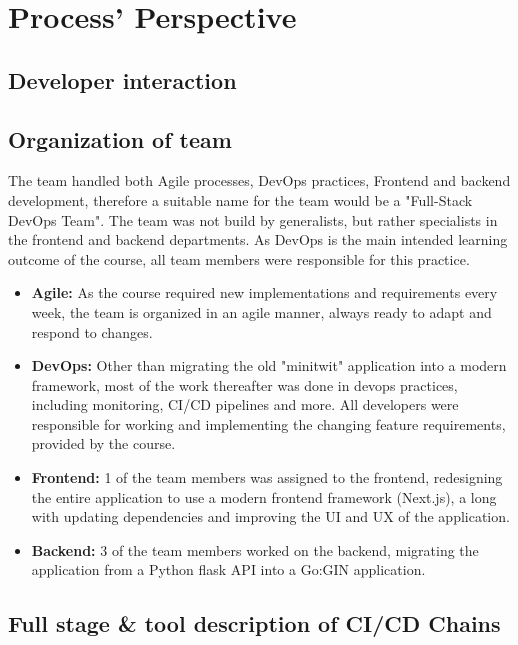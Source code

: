 \section{Process' Perspective}

\subsection{Developer interaction}


\subsection{Organization of team}\label{subsec:organization_of_team}
The team handled both Agile processes, DevOps practices, Frontend and backend development, therefore a suitable name for the team would be a "Full-Stack DevOps Team". The team was not build by generalists, but rather specialists in the frontend and backend departments. As DevOps is the main intended learning outcome of the course, all team members were responsible for this practice.
\begin{itemize}
    \item \textbf{Agile:} As the course required new implementations and requirements every week, the team is organized in an agile manner, always ready to adapt and respond to changes.
    \item \textbf{DevOps:} Other than migrating the old "minitwit" application into a modern framework, most of the work thereafter was done in devops practices, including monitoring, CI/CD pipelines and more. All developers were responsible for working and implementing the changing feature requirements, provided by the course.
    \item \textbf{Frontend:} 1 of the team members was assigned to the frontend, redesigning the entire application to use a modern frontend framework (Next.js), a long with updating dependencies and improving the UI and UX of the application.
    \item \textbf{Backend:} 3 of the team members worked on the backend, migrating the application from a Python flask API into a Go:GIN application.
\end{itemize}

\subsection{Full stage \& tool description of CI/CD Chains}


